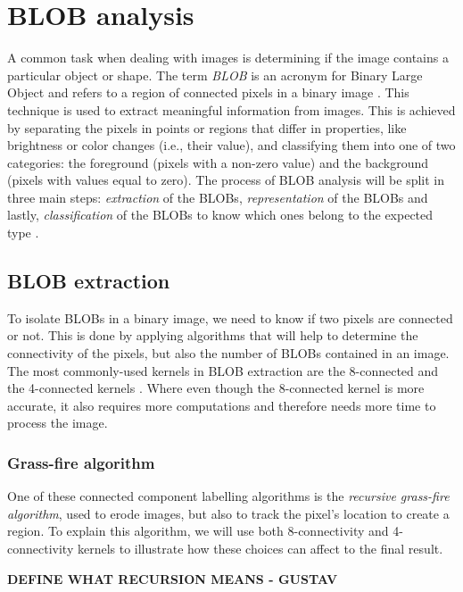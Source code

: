\section{BLOB analysis}\label{blob}
A common task when dealing with images is determining if the image contains a particular object or shape. The term \textit{BLOB} is an acronym for Binary Large Object and refers to a region of connected pixels in a binary image \citep{ip_book}. This technique is used to extract meaningful information from images. This is achieved by separating the pixels in points or regions that differ in properties, like brightness or color changes (i.e., their value), and classifying them into one of two categories: the foreground (pixels with a non-zero value) and the background (pixels with values equal to zero).
The process of BLOB analysis will be split in three main steps: \textit{extraction} of the BLOBs, \textit{representation} of the BLOBs and lastly, \textit{classification} of the BLOBs to know which ones belong to the expected type \citep{ip_book}.

\subsection{BLOB extraction}
To isolate BLOBs in a binary image, we need to know if two pixels are connected or not. This is done by applying algorithms that will help to determine the connectivity of the pixels, but also the number of BLOBs contained in an image. The most commonly-used kernels in BLOB extraction are the 8-connected and the 4-connected kernels \citep{ip_book}. Where even though the 8-connected kernel is more accurate, it also requires more computations and therefore needs more time to process the image.

\subsubsection{Grass-fire algorithm}
One of these connected component labelling algorithms is the \textit{recursive grass-fire algorithm}, used to erode images, but also to track the pixel's location to create a region.
To explain this algorithm, we will use both 8-connectivity and 4-connectivity kernels to illustrate how these choices can affect to the final result.

\textbf{DEFINE WHAT RECURSION MEANS - GUSTAV}

